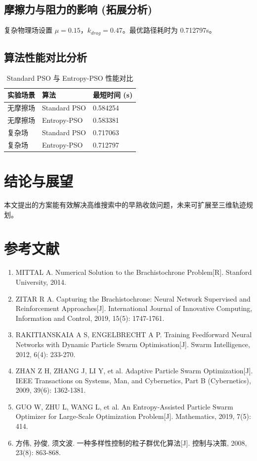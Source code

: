 \documentclass[twocolumn, UTF8, a4paper]{ctexart}
\newcommand{\xiaosi}{\fontsize{12pt}{15pt}\selectfont}
\newcommand{\wuhao}{\fontsize{10.5pt}{12.6pt}\selectfont}
\begin{document}
	\subsection{摩擦力与阻力的影响 (拓展分析)}
	复杂物理场设置 $\mu=0.15$，$k_{drag}=0.47$。最优路径耗时为 0.712797s。
	
	\subsection{算法性能对比分析}
	\begin{table}[h]
		\caption{Standard PSO 与 Entropy-PSO 性能对比}
		\xiaosi
		\begin{tabular}{lll}
			\toprule
			实验场景 & 算法 & 最短时间 (s) \\
			\midrule
			无摩擦场 & Standard PSO & 0.584254 \\
			无摩擦场 & Entropy-PSO & 0.583381 \\
			复杂场 & Standard PSO & 0.717063 \\
			复杂场 & Entropy-PSO & 0.712797 \\
			\bottomrule
		\end{tabular}
	\end{table}
	
	\section{结论与展望}
	本文提出的方案能有效解决高维搜索中的早熟收敛问题，未来可扩展至三维轨迹规划。
	
	\section*{参考文献}
	\wuhao %
	\begin{enumerate}
		\item[{[1]}] MITTAL A. Numerical Solution to the Brachistochrone Problem[R]. Stanford University, 2014.
		\item[{[2]}] ZITAR R A. Capturing the Brachistochrone: Neural Network Supervised and Reinforcement Approaches[J]. International Journal of Innovative Computing, Information and Control, 2019, 15(5): 1747-1761.
		\item[{[3]}] RAKITIANSKAIA A S, ENGELBRECHT A P. Training Feedforward Neural Networks with Dynamic Particle Swarm Optimisation[J]. Swarm Intelligence, 2012, 6(4): 233-270.
		\item[{[4]}] ZHAN Z H, ZHANG J, LI Y, et al. Adaptive Particle Swarm Optimization[J]. IEEE Transactions on Systems, Man, and Cybernetics, Part B (Cybernetics), 2009, 39(6): 1362-1381.
		\item[{[5]}] GUO W, ZHU L, WANG L, et al. An Entropy-Assisted Particle Swarm Optimizer for Large-Scale Optimization Problem[J]. Mathematics, 2019, 7(5): 414.
		\item[{[6]}] 方伟, 孙俊, 须文波. 一种多样性控制的粒子群优化算法[J]. 控制与决策, 2008, 23(8): 863-868.
	\end{enumerate}
	
\end{document}
